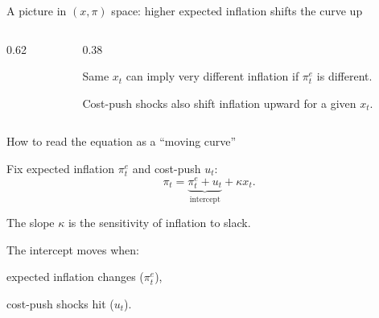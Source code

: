 \documentclass[aspectratio=169,xcolor=dvipsnames]{beamer}
\let\tempone\itemize
\let\temptwo\enditemize
\renewenvironment{itemize}{\tempone\addtolength{\itemsep}{\fill}}{\temptwo}
\begin{document}
\begin{frame}{A picture in $(x,\pi)$ space: higher expected inflation shifts the curve up}
\begin{columns}
\begin{column}{0.62\textwidth}
\centering
{}
\end{column}
\begin{column}{0.38\textwidth}
\small
\begin{itemize}
\item Same $x_t$ can imply very different inflation if $\pi_t^e$ is different.
\item Cost-push shocks also shift inflation upward for a given $x_t$.
\end{itemize}
\end{column}
\end{columns}
\end{frame}

\begin{frame}{How to read the equation as a ``moving curve''}
\begin{itemize}
\item Fix expected inflation $\pi_t^e$ and cost-push $u_t$:
\[
\pi_t = \underbrace{\pi_t^e+u_t}_{\text{intercept}} + \kappa x_t.
\]
\item The slope $\kappa$ is the sensitivity of inflation to slack.
\item The intercept moves when:
\begin{itemize}
\item expected inflation changes ($\pi_t^e$),
\item cost-push shocks hit ($u_t$).
\end{itemize}
\end{itemize}
\end{frame}
\end{document}
